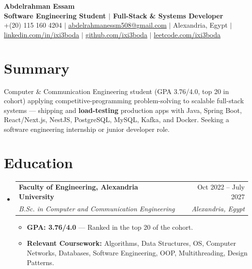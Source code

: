 \documentclass[letterpaper,10pt]{article}
\makeatletter
\newcommand{\resumeItem}[1]{
  \item \small{#1}
}
\newcommand{\resumeSubheading}[4]{
  \vspace{-2pt}\item
  \begin{tabular*}{\textwidth}{l@{\extracolsep{\fill}}r}
    \textbf{#1} & #2 \\
    \textit{#3} & \textit{#4} \\
  \end{tabular*}\vspace{-6pt}\par
}
\newcommand{\resumeSubHeadingListStart}{\begin{itemize}[leftmargin=0in, label={}]}
\newcommand{\resumeSubHeadingListEnd}{\end{itemize}}
\newcommand{\resumeItemListStart}{
\begin{itemize}[leftmargin=0.15in, topsep=0pt, itemsep=2pt, parsep=0pt]
}
\newcommand{\resumeItemListEnd}{
\end{itemize}\vspace{3pt}\par
}
\makeatother
\begin{document}
\begin{center}
    {\huge \textbf{Abdelrahman Essam}} \\ \vspace{2pt}
    \textbf{Software Engineering Student $|$ Full-Stack \& Systems Developer} \\ \vspace{3pt}
    \small
    +(20) 115 160 4204 $|$
    \href{mailto:abdelrahmanessm508@gmail.com}{abdelrahmanessm508@gmail.com} $|$
    Alexandria, Egypt $|$
    \href{https://www.linkedin.com/in/ixi3boda}{linkedin.com/in/ixi3boda} $|$
    \href{https://github.com/ixi3boda}{github.com/ixi3boda} $|$
    \href{https://leetcode.com/ixi3boda}{leetcode.com/ixi3boda}
\end{center}
\vspace{-10pt}

\section{Summary}
\begin{itemize}[leftmargin=0in, label={}, topsep=0pt]
\small{\item{
Computer \& Communication Engineering student (GPA 3.76/4.0, top 20 in cohort) applying competitive-programming problem-solving to scalable full-stack systems --- shipping and \textbf{load-testing} production apps with Java, Spring Boot, React/Next.js, NestJS, PostgreSQL, MySQL, Kafka, and Docker. Seeking a software engineering internship or junior developer role.
}}
\end{itemize}
\vspace{-4pt}

\section{Education}
\resumeSubHeadingListStart
\resumeSubheading
  {Faculty of Engineering, Alexandria University}{Oct 2022 -- July 2027}
  {B.Sc. in Computer and Communication Engineering}{Alexandria, Egypt}
  \resumeItemListStart
    \resumeItem{\textbf{GPA: 3.76/4.0} --- Ranked in the top 20 of the cohort.}
    \resumeItem{\textbf{Relevant Coursework:} Algorithms, Data Structures, OS, Computer Networks, Databases, Software Engineering, OOP, Multithreading, Design Patterns.}
  \resumeItemListEnd
\resumeSubHeadingListEnd

\end{document}
